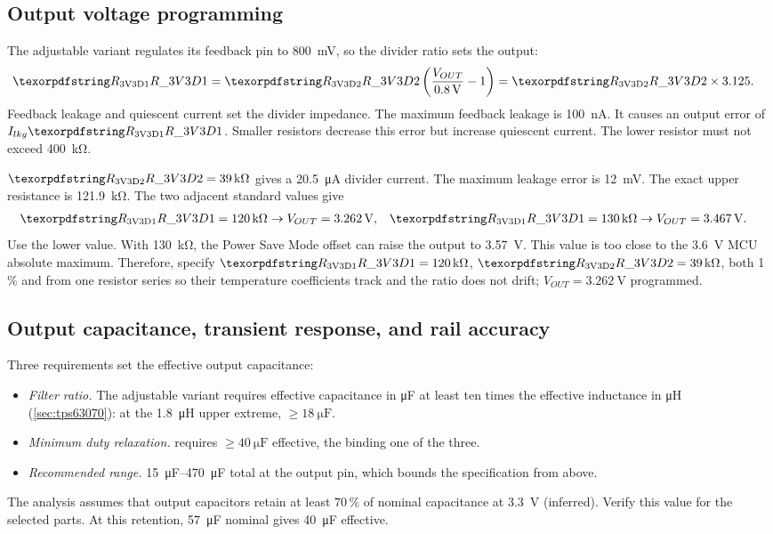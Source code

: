 \subsection{Output voltage programming}\label{sec:3v3-fb}

The adjustable variant regulates its feedback pin to \SI{800}{\milli\volt}, so
the divider ratio sets the output:
\begin{align*}
  \des{R}{3V3D1} &= \des{R}{3V3D2}\left(\frac{V_{OUT}}{\SI{0.8}{\volt}}-1\right)
    = \des{R}{3V3D2}\times 3.125.
\end{align*}
Feedback leakage and quiescent current set the divider impedance. The maximum
feedback leakage is \SI{100}{\nano\ampere}. It causes an output error of
$I_{lkg}\des{R}{3V3D1}$. Smaller resistors decrease this error but increase
quiescent current. The lower resistor must not exceed \SI{400}{\kilo\ohm}.

$\des{R}{3V3D2} = \SI{39}{\kilo\ohm}$ gives a
\SI{20.5}{\micro\ampere} divider current. The maximum leakage error is
\SI{12}{\milli\volt}. The exact upper resistance is
\SI{121.9}{\kilo\ohm}. The two adjacent standard values give
\begin{align*}
  \des{R}{3V3D1} = \SI{120}{\kilo\ohm} &\rightarrow V_{OUT} = \SI{3.262}{\volt}, &
  \des{R}{3V3D1} = \SI{130}{\kilo\ohm} &\rightarrow V_{OUT} = \SI{3.467}{\volt}.
\end{align*}
Use the lower value. With \SI{130}{\kilo\ohm}, the Power Save Mode offset can
raise the output to \SI{3.57}{\volt}. This value is too close to the
\SI{3.6}{\volt} MCU absolute maximum. Therefore, specify
$\des{R}{3V3D1} = \SI{120}{\kilo\ohm}$, $\des{R}{3V3D2} = \SI{39}{\kilo\ohm}$, both 1\,\% and from
one resistor series so their temperature coefficients track and the ratio does
not drift; $V_{OUT} = \SI{3.262}{\volt}$ programmed.

\subsection{Output capacitance, transient response, and rail accuracy}\label{sec:3v3-cout}

Three requirements set the effective output capacitance:
\begin{itemize}[nosep]
  \item \emph{Filter ratio.} The adjustable variant requires effective
    capacitance in \si{\micro\farad} at least ten times the effective inductance
    in \si{\micro\henry} (\cref{sec:tps63070}): at the \SI{1.8}{\micro\henry}
    upper extreme, $\geq\SI{18}{\micro\farad}$.
  \item \emph{Minimum duty relaxation.}  requires
    $\geq\SI{40}{\micro\farad}$ effective, the binding one of the three.
  \item \emph{Recommended range.} \SIrange{15}{470}{\micro\farad} total at the
    output pin, which bounds the specification from above.
\end{itemize}
The analysis assumes that output capacitors retain at least $70\,\%$ of nominal
capacitance at \SI{3.3}{\volt} (inferred). Verify this value for the selected
parts. At this retention, \SI{57}{\micro\farad} nominal gives
\SI{40}{\micro\farad} effective.


